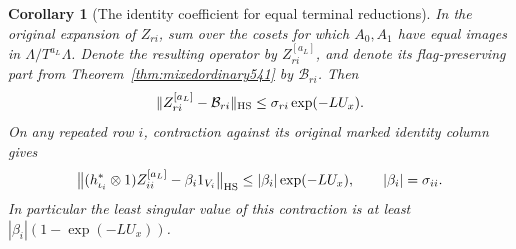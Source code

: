 \documentclass[a4paper,11pt]{article}
\newtheorem{corollary}[proposition]{Corollary}
\theoremstyle{definition}
\theoremstyle{remark}
\numberwithin{equation}{section}
\begin{document}
\begin{corollary}[The identity coefficient for equal terminal reductions]
\leavevmode\label{cor:terminalidentity639}
In the original expansion of \(Z_{ri}\), sum over the cosets for
which \(A_0,A_1\) have equal images in \(\Lambda/T^{a_L}\Lambda\).
Denote the resulting operator by \(Z_{ri}^{[a_L]}\), and denote
its flag-preserving part from Theorem~\ref{thm:mixedordinary541}
by \(\mathcal B_{ri}\). Then
\[
         \|Z_{ri}^{[a_L]}-\mathcal B_{ri}\|_{\rm HS}
                      \le \sigma_{ri}\exp(-LU_x).
\]
On any repeated row \(i\), contraction against its original
marked identity column gives
\[
 \big\|(h_{\iota_i}^{*}\otimes1)Z_{ii}^{[a_L]}
                 -\beta_i1_{V_i}\big\|_{\rm HS}
                \le |\beta_i|\exp(-LU_x),
           \qquad |\beta_i|=\sigma_{ii}.
\]
In particular the least singular value of this contraction is
at least \(|\beta_i|(1-\exp(-LU_x))\).
\end{corollary}
\end{document}
